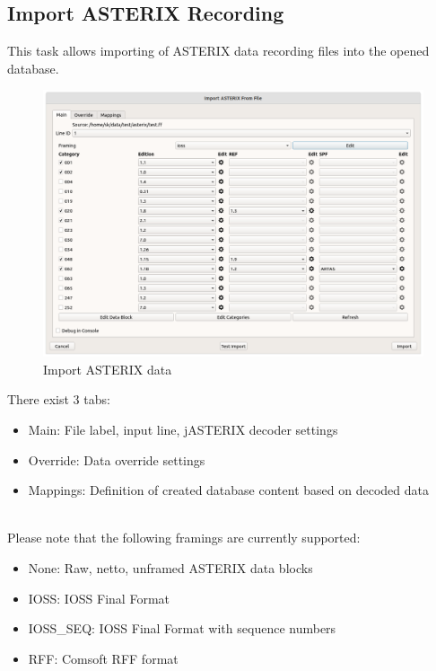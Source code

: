 \subsection{Import ASTERIX Recording}
\label{sec:ui_import_asterix}

This task allows importing of ASTERIX data recording files into the opened database. \\

\begin{figure}[H]
  \center
    \hspace*{-0.5cm}
    \includegraphics[width=17cm]{figures/asterix_import_data.png}
  \caption{Import ASTERIX data}
\end{figure}

There exist 3 tabs:

\begin{itemize}
\item Main: File label, input line, jASTERIX decoder settings
\item Override: Data override settings
\item Mappings: Definition of created database content based on decoded data
\end{itemize}
\ \\

Please note that the following framings are currently supported:
\begin{itemize}
\item None: Raw, netto, unframed ASTERIX data blocks
\item IOSS: IOSS Final Format
\item IOSS\_SEQ: IOSS Final Format with sequence numbers
\item RFF: Comsoft RFF format
\end{itemize}
\ \\

